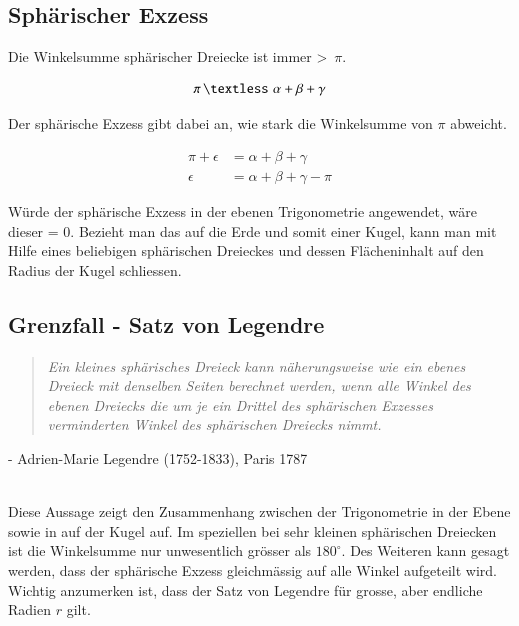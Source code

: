 \begin{refsection}
\section{Sphärischer Exzess}
Die Winkelsumme sphärischer Dreiecke ist immer \textgreater \,  $\pi$.

\begin{align*}
\pi \, \textless \, \, \alpha + \beta + \gamma
\end{align*}

Der sphärische Exzess gibt dabei an, wie stark die Winkelsumme von $\pi$ abweicht.

\begin{align*}
\pi + \epsilon &= \alpha + \beta + \gamma \\
\epsilon &= \alpha + \beta + \gamma - \pi
\end{align*}

Würde der sphärische Exzess in der ebenen Trigonometrie angewendet, wäre dieser = 0. 
Bezieht man das auf die Erde und somit einer Kugel, kann man mit Hilfe eines beliebigen sphärischen Dreieckes und dessen Flächeninhalt auf den Radius der Kugel schliessen.

\subsection{Grenzfall - Satz von Legendre}

\begin{quote} \textit{Ein kleines sphärisches Dreieck kann näherungsweise 
wie ein ebenes Dreieck mit denselben Seiten berechnet 
werden, wenn alle Winkel des ebenen Dreiecks die um 
je ein Drittel des sphärischen Exzesses verminderten 
Winkel des sphärischen Dreiecks nimmt.} \end{quote}
\begin{flushright} - Adrien-Marie Legendre (1752-1833), Paris 1787
\end{flushright}\\

Diese Aussage zeigt den Zusammenhang zwischen der 
Trigonometrie in der Ebene sowie in auf der Kugel
auf. Im speziellen bei sehr kleinen sphärischen 
Dreiecken ist die Winkelsumme nur unwesentlich 
grösser als $180^{\circ}$. Des Weiteren kann gesagt werden,
dass der sphärische Exzess gleichmässig auf alle
Winkel aufgeteilt wird.
Wichtig anzumerken ist, dass der Satz von Legendre 
für grosse, aber endliche Radien $r$ gilt.

%



\end{refsection}

